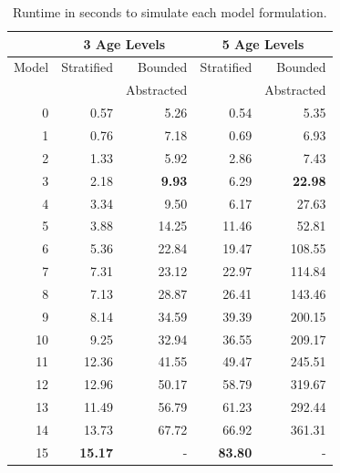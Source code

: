 \begin{table}\centering
	\begin{tabular}{|r||r|r||r|r|}
		\hline      & \multicolumn{2}{|c||}{3 Age Levels} & \multicolumn{2}{|c|}{5 Age Levels}                             \\
		\hline	Model & Stratified                          & Bounded                            & Stratified  & Bounded     \\
		            &                                     & Abstracted                         &             & Abstracted  \\	\hline
		0           & 0.57                                & 5.26                               & 0.54        & 5.35        \\
		1           & 0.76                                & 7.18                               & 0.69        & 6.93        \\
		2           & 1.33                                & 5.92                               & 2.86        & 7.43        \\
		3           & 2.18                                & {\bf 9.93}                         & 6.29        & {\bf 22.98} \\
		4           & 3.34                                & 9.50                               & 6.17        & 27.63       \\
		5           & 3.88                                & 14.25                              & 11.46       & 52.81       \\
		6           & 5.36                                & 22.84                              & 19.47       & 108.55      \\
		7           & 7.31                                & 23.12                              & 22.97       & 114.84      \\
		8           & 7.13                                & 28.87                              & 26.41       & 143.46      \\
		9           & 8.14                                & 34.59                              & 39.39       & 200.15      \\
		10          & 9.25                                & 32.94                              & 36.55       & 209.17      \\
		11          & 12.36                               & 41.55                              & 49.47       & 245.51      \\
		12          & 12.96                               & 50.17                              & 58.79       & 319.67      \\
		13          & 11.49                               & 56.79                              & 61.23       & 292.44      \\
		14          & 13.73                               & 67.72                              & 66.92       & 361.31      \\
		15          & {\bf 15.17}                         & -                                  & {\bf 83.80} & -           \\	\hline
	\end{tabular}
	\caption{\label{tab:sirhd_results}  Runtime in seconds to simulate each model formulation.  }


\end{table}
